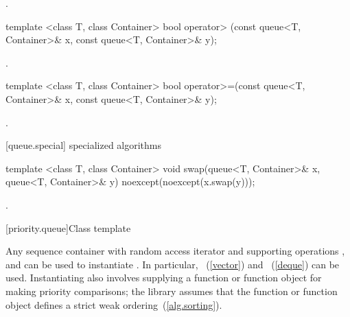 \begin{itemdescr}
\pnum
\returns
{}.
\end{itemdescr}

%
\begin{itemdecl}
template <class T, class Container>
  bool operator> (const queue<T, Container>& x, const queue<T, Container>& y);
\end{itemdecl}

\begin{itemdescr}
\pnum
\returns
{}.
\end{itemdescr}

%
\begin{itemdecl}
template <class T, class Container>
    bool operator>=(const queue<T, Container>& x,
                    const queue<T, Container>& y);
\end{itemdecl}

\begin{itemdescr}
\pnum
\returns
{}.
\end{itemdescr}

[queue.special]{ specialized algorithms}

%
%
\begin{itemdecl}
template <class T, class Container>
  void swap(queue<T, Container>& x, queue<T, Container>& y) noexcept(noexcept(x.swap(y)));
\end{itemdecl}

\begin{itemdescr}
\pnum
\effects {}.
\end{itemdescr}

[priority.queue]{Class template }

\pnum
{}%
Any sequence container with random access iterator and supporting operations
,
and
can be used to instantiate
.
In particular,
~(\ref{vector})
and
~(\ref{deque})
can be used.
Instantiating
also involves supplying a function or function object for making
priority comparisons; the library assumes that the function or function
object defines a strict weak ordering~(\ref{alg.sorting}).

